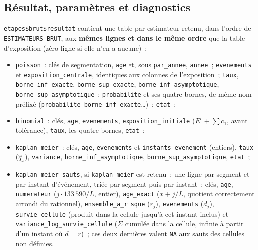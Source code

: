 \documentclass[a4paper,11pt]{article}
\newcommand{\code}[1]{\texttt{\small #1}}
\begin{document}
\subsection{Résultat, paramètres et diagnostics}
\label{sec:brut-resultat}

\code{etapes\$brut\$resultat} contient une table par estimateur retenu,
dans l'ordre de \code{ESTIMATEURS\_BRUT}, aux \textbf{mêmes lignes et dans le
même ordre} que la table d'exposition (zéro ligne si elle n'en a aucune)~:

\begin{itemize}[leftmargin=*, itemsep=2pt]
  \item \sloppy \code{poisson}~: clés de segmentation, \code{age} et, sous
    \code{par\_annee}, \code{annee}~; \code{evenements} et
    \code{exposition\_centrale}, identiques aux colonnes de l'exposition~;
    \code{taux}, \code{borne\_inf\_exacte}, \code{borne\_sup\_exacte},
    \code{borne\_inf\_asymptotique}, \code{borne\_sup\_asymptotique}~;
    \code{probabilite} et ses quatre bornes, de même nom préfixé
    (\code{probabilite\_}\allowbreak\code{borne\_inf\_exacte}\ldots)~;
    \code{etat}~;
  \item \code{binomial}~: clés, \code{age}, \code{evenements},
    \code{exposition\_initiale} ($E^c + \sum c_1$, avant tolérance),
    \code{taux}, les quatre bornes, \code{etat}~;
  \item \code{kaplan\_meier}~: clés, \code{age}, \code{evenements} et
    \code{instants\_evenement} (entiers), \code{taux} ($\hat q_x$),
    \code{variance}, \code{borne\_inf\_asymptotique},
    \code{borne\_sup\_asymptotique}, \code{etat}~;
  \item \code{kaplan\_meier\_sauts}, si \code{kaplan\_meier} est retenu~: une
    ligne par segment et par instant d'événement, triée par segment puis par
    instant~: clés, \code{age}, \code{numerateur} ($j \cdot 133\,590/L$,
    entier), \code{age\_exact} ($x + j/L$, quotient correctement arrondi du
    rationnel), \code{ensemble\_a\_risque} ($r_j$), \code{evenements}
    ($d_j$), \code{survie\_cellule} (produit dans la cellule jusqu'à cet
    instant inclus) et \code{variance\_log\_survie\_cellule} ($\Sigma$
    cumulée dans la cellule, infinie à partir d'un instant où $d = r$)~; ces deux
    dernières valent \code{NA} aux sauts des cellules non définies.
\end{itemize}
\end{document}
